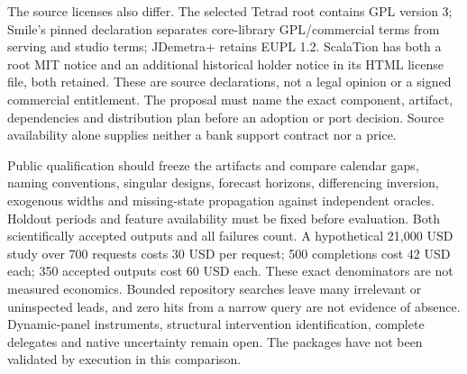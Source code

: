 The source licenses also differ. The selected Tetrad root contains GPL version 3; Smile's pinned declaration separates core-library GPL/commercial terms from serving and studio terms; JDemetra+ retains EUPL 1.2. ScalaTion has both a root MIT notice and an additional historical holder notice in its HTML license file, both retained. These are source declarations, not a legal opinion or a signed commercial entitlement. The proposal must name the exact component, artifact, dependencies and distribution plan before an adoption or port decision. Source availability alone supplies neither a bank support contract nor a price.~\citep{exec25_jdyn_tetrad,exec25_jdyn_smile,exec25_jdyn_scalation,exec25_jdyn_jdplus}

Public qualification should freeze the artifacts and compare calendar gaps, naming conventions, singular designs, forecast horizons, differencing inversion, exogenous widths and missing-state propagation against independent oracles. Holdout periods and feature availability must be fixed before evaluation. Both scientifically accepted outputs and all failures count. A hypothetical 21,000 USD study over 700 requests costs 30 USD per request; 500 completions cost 42 USD each; 350 accepted outputs cost 60 USD each. These exact denominators are not measured economics. Bounded repository searches leave many irrelevant or uninspected leads, and zero hits from a narrow query are not evidence of absence. Dynamic-panel instruments, structural intervention identification, complete delegates and native uncertainty remain open. The packages have not been validated by execution in this comparison.~\citep{exec25_jdyn_choice}

